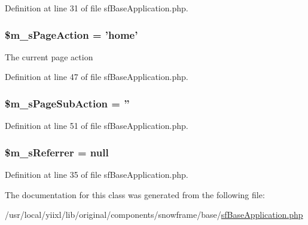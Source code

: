 Definition at line 31 of file sfBaseApplication.php.

\hypertarget{classSFApplication_a82cc1f3844569fa451cac5abc03b1a4d}{
\subsubsection[{\$m\_\-sPageAction}]{\setlength{\rightskip}{0pt plus 5cm}\$m\_\-sPageAction = 'home'}}
\label{classSFApplication_a82cc1f3844569fa451cac5abc03b1a4d}
The current page action 

Definition at line 47 of file sfBaseApplication.php.

\hypertarget{classSFApplication_a980e6fd9e83172281b1e6dac50f16e9c}{
\subsubsection[{\$m\_\-sPageSubAction}]{\setlength{\rightskip}{0pt plus 5cm}\$m\_\-sPageSubAction = ''}}
\label{classSFApplication_a980e6fd9e83172281b1e6dac50f16e9c}


Definition at line 51 of file sfBaseApplication.php.

\hypertarget{classSFApplication_a251ed856d45aa28d717a012291b71d26}{
\subsubsection[{\$m\_\-sReferrer}]{\setlength{\rightskip}{0pt plus 5cm}\$m\_\-sReferrer = null}}
\label{classSFApplication_a251ed856d45aa28d717a012291b71d26}


Definition at line 35 of file sfBaseApplication.php.



The documentation for this class was generated from the following file:\begin{DoxyCompactItemize}
\item 
/usr/local/yiixl/lib/original/components/snowframe/base/\hyperlink{sfBaseApplication_8php}{sfBaseApplication.php}\end{DoxyCompactItemize}
